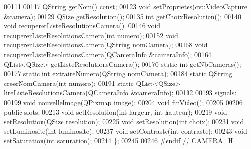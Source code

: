 \begin{DoxyCode}
00111 
00117     QString getNom() \textcolor{keyword}{const};
00123     \textcolor{keywordtype}{void} setProprietes(cv::VideoCapture &camera);
00129     QSize getResolution();
00135     \textcolor{keywordtype}{int} getChoixResolution();
00140     \textcolor{keywordtype}{void} recupererListeResolutionsCamera();
00146     \textcolor{keywordtype}{void} recupererListeResolutionsCamera(\textcolor{keywordtype}{int} numero);
00152     \textcolor{keywordtype}{void} recupererListeResolutionsCamera(QString nomCamera);
00158     \textcolor{keywordtype}{void} recupererListeResolutionsCamera(QCameraInfo &cameraInfo);
00164     QList<QSize> getListeResolutionsCamera();
00170     \textcolor{keyword}{static} \textcolor{keywordtype}{int} getNbCameras();
00177     \textcolor{keyword}{static} \textcolor{keywordtype}{int} extraireNumero(QString nomCamera);
00184     \textcolor{keyword}{static} QString creerNomCamera(\textcolor{keywordtype}{int} numero);
00191     \textcolor{keyword}{static} QList<QSize> lireListeResolutionsCamera(QCameraInfo &cameraInfo);
00192 
00193 signals:
00199     \textcolor{keywordtype}{void} nouvelleImage(QPixmap image);
00204     \textcolor{keywordtype}{void} finVideo();
00205 
00206 \textcolor{keyword}{public} slots:    
00213     \textcolor{keywordtype}{void} setResolution(\textcolor{keywordtype}{int} largeur, \textcolor{keywordtype}{int} hauteur);
00219     \textcolor{keywordtype}{void} setResolution(QSize resolution);
00225     \textcolor{keywordtype}{void} setResolution(\textcolor{keywordtype}{int} choix);
00231     \textcolor{keywordtype}{void} setLuminosite(\textcolor{keywordtype}{int} luminosite);
00237     \textcolor{keywordtype}{void} setContraste(\textcolor{keywordtype}{int} contraste);
00243     \textcolor{keywordtype}{void} setSaturation(\textcolor{keywordtype}{int} saturation);
00244 \};
00245 
00246 \textcolor{preprocessor}{#endif // CAMERA\_H}
\end{DoxyCode}
